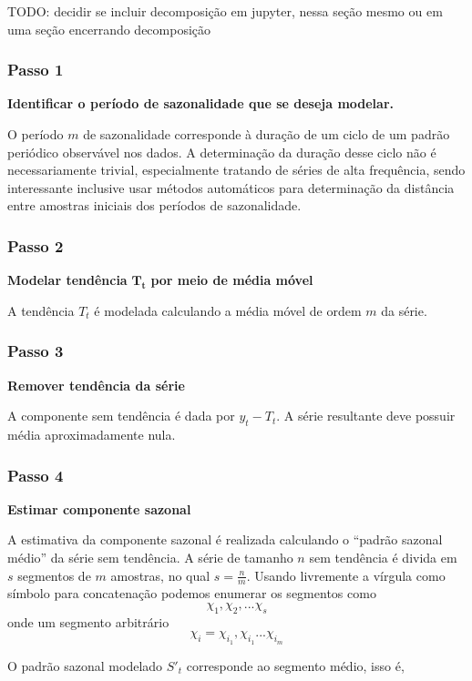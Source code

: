 TODO: decidir se incluir decomposição em jupyter, nessa seção mesmo ou em uma
seção encerrando decomposição

\subsubsection{Passo 1}

\textbf{Identificar o período de sazonalidade que se deseja modelar.}

O período $m$ de sazonalidade corresponde à duração de um ciclo de um padrão
periódico observável nos dados. A determinação da duração desse ciclo não é
necessariamente trivial, especialmente tratando de séries de alta frequência,
sendo interessante inclusive usar métodos automáticos para determinação da
distância entre amostras iniciais dos períodos de sazonalidade.

\subsubsection{Passo 2}

\textbf{Modelar tendência }$\mathbf{T_t}$\textbf{ por meio de média móvel}

A tendência $T_t$ é modelada calculando a média móvel de ordem $m$ da
série.

\subsubsection{Passo 3}

\textbf{Remover tendência da série}

A componente sem tendência é dada por $y_t - T_t$. A série resultante deve
possuir média aproximadamente nula.

\subsubsection{Passo 4}

\textbf{Estimar componente sazonal}

A estimativa da componente sazonal é realizada calculando o ``padrão sazonal
médio'' da série sem tendência. A série de tamanho $n$ sem tendência é divida
em $s$ segmentos de $m$ amostras, no qual $s = \frac{n}{m}$. Usando livremente
a vírgula como símbolo para concatenação podemos enumerar os segmentos como
$$\chi_1, \chi_2, ... \chi_s$$ onde um segmento arbitrário $$\chi_i =
\chi_{i_{1}}, \chi_{i_{1}} ... \chi_{i_{m}}$$

O padrão sazonal modelado $S'_t$ corresponde ao segmento médio, isso é,

